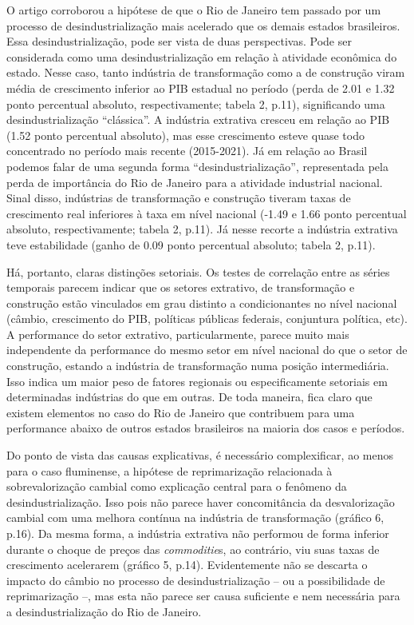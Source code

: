 {{O artigo corroborou a hipótese de que o Rio de Janeiro tem passado por
um processo de desindustrialização mais acelerado que os demais estados
brasileiros. Essa desindustrialização, pode ser vista de duas
perspectivas. Pode ser considerada como uma desindustrialização em
relação à atividade econômica do estado. Nesse caso, tanto indústria de
transformação como a de construção viram média de crescimento inferior
ao PIB estadual no período (perda de 2.01 e 1.32 ponto percentual
absoluto, respectivamente; tabela 2, p.11), significando uma
desindustrialização ``clássica''. A indústria extrativa cresceu em
relação ao PIB (1.52 ponto percentual absoluto), mas esse crescimento
esteve quase todo concentrado no período mais recente (2015-2021). Já em
relação ao Brasil podemos falar de uma segunda forma
``desindustrialização'', representada pela perda de importância do Rio
de Janeiro para a atividade industrial nacional. Sinal disso, indústrias
de transformação e construção tiveram taxas de crescimento real
inferiores à taxa em nível nacional (-1.49 e 1.66 ponto percentual
absoluto, respectivamente; tabela 2, p.11). Já nesse recorte a indústria
extrativa teve estabilidade (ganho de 0.09 ponto percentual absoluto;
tabela 2, p.11).

Há, portanto, claras distinções setoriais. Os testes de correlação entre
as séries temporais parecem indicar que os setores extrativo, de
transformação e construção estão vinculados em grau distinto a
condicionantes no nível nacional (câmbio, crescimento do PIB, políticas
públicas federais, conjuntura política, etc). A performance do setor
extrativo, particularmente, parece muito mais independente da
performance do mesmo setor em nível nacional do que o setor de
construção, estando a indústria de transformação numa posição
intermediária. Isso indica um maior peso de fatores regionais ou
especificamente setoriais em determinadas indústrias do que em outras.
De toda maneira, fica claro que existem elementos no caso do Rio de
Janeiro que contribuem para uma performance abaixo de outros estados
brasileiros na maioria dos casos e períodos.

Do ponto de vista das causas explicativas, é necessário complexificar,
ao menos para o caso fluminense, a hipótese de reprimarização
relacionada à sobrevalorização cambial como explicação central para o
fenômeno da desindustrialização. Isso pois não parece haver
concomitância da desvalorização cambial com uma melhora contínua na
indústria de transformação (gráfico 6, p.16). Da mesma forma, a
indústria extrativa não performou de forma inferior durante o choque de
preços das \emph{commoditie}s, ao contrário, viu suas taxas de
crescimento acelerarem (gráfico 5, p.14). Evidentemente não se descarta
o impacto do câmbio no processo de desindustrialização -- ou a
possibilidade de reprimarização --, mas esta não parece ser causa
suficiente e nem necessária para a desindustrialização do Rio de
Janeiro.

}}
